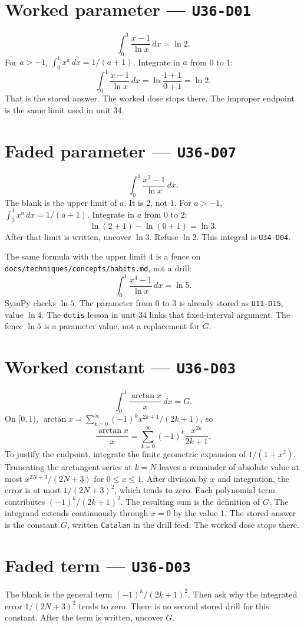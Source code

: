 \section{Worked parameter --- \texttt{U36-D01}}
\[
\int_0^1\frac{x-1}{\ln x}\,dx=\ln 2.
\]
For $a>-1$, $\int_0^1 x^a\,dx=1/(a+1)$. Integrate in $a$ from 0 to 1:
\[
\int_0^1\frac{x-1}{\ln x}\,dx=\ln\frac{1+1}{0+1}=\ln 2.
\]
That is the stored answer. The worked dose stops there. The improper endpoint is the same limit used in unit 34.

\section{Faded parameter --- \texttt{U36-D07}}
\[
\int_0^1\frac{x^2-1}{\ln x}\,dx.
\]
The blank is the upper limit of $a$. It is $2$, not $1$. For $a>-1$, $\int_0^1 x^a\,dx=1/(a+1)$. Integrate in $a$ from $0$ to $2$:
\[
\ln(2+1)-\ln(0+1)=\ln 3.
\]
After that limit is written, uncover $\ln 3$. Refuse $\ln 2$. This integral is \texttt{U34-D04}.

The same formula with the upper limit $4$ is a fence on \texttt{docs/techniques/concepts/habits.md}, not a drill:
\[
\int_0^1\frac{x^4-1}{\ln x}\,dx=\ln 5.
\]
SymPy checks $\ln 5$. The parameter from $0$ to $3$ is already stored as \texttt{U11-D15}, value $\ln 4$. The \texttt{dutis} lesson in unit 34 links that fixed-interval argument. The fence $\ln 5$ is a parameter value, not a replacement for $G$.

\section{Worked constant --- \texttt{U36-D03}}
\[
\int_0^1\frac{\arctan x}{x}\,dx=G.
\]
On $[0,1)$, $\arctan x=\sum_{k=0}^{\infty}(-1)^k x^{2k+1}/(2k+1)$, so
\[
\frac{\arctan x}{x}=\sum_{k=0}^{\infty}(-1)^k\frac{x^{2k}}{2k+1}.
\]
To justify the endpoint, integrate the finite geometric expansion of $1/(1+x^2)$. Truncating the arctangent series at $k=N$ leaves a remainder of absolute value at most $x^{2N+3}/(2N+3)$ for $0\leq x\leq1$. After division by $x$ and integration, the error is at most $1/(2N+3)^2$, which tends to zero. Each polynomial term contributes $(-1)^k/(2k+1)^2$. The resulting sum is the definition of $G$. The integrand extends continuously through $x=0$ by the value $1$. The stored answer is the constant $G$, written \texttt{Catalan} in the drill feed. The worked dose stops there.

\section{Faded term --- \texttt{U36-D03}}
The blank is the general term $(-1)^k/(2k+1)^2$. Then ask why the integrated error $1/(2N+3)^2$ tends to zero. There is no second stored drill for this constant. After the term is written, uncover $G$.

